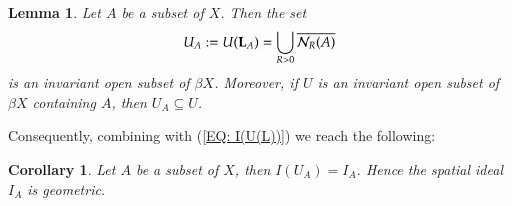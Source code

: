 \documentclass[12pt, a4paper]{amsart}
\numberwithin{equation}{section}
\newtheorem{cor}[thm]{Corollary}
\newtheorem{lem}[thm]{Lemma}
\theoremstyle{definition}
\theoremstyle{remark}
\newtheorem{rem}[thm]{Remark}
\def\CC{\mathbb{C}}
\def\L{\mathcal{L}}
\def\Nd{\mathcal{N}}
\def\B{\mathfrak{B}}
\def\K{\mathfrak{K}}
\def\supp{\mathrm{supp}}
\def\L{{\bf L}}
\begin{document}


\begin{lem}\label{lem: invariant subset}
Let $A$ be a subset of $X$. Then the set
\begin{equation}\label{EQ:UA}
U_A:=U(\L_A) = \bigcup_{R>0} \overline{\Nd_R(A)} 
\end{equation}
is an invariant open subset of $\beta X$. Moreover, if $U$ is an invariant open subset of $\beta X$ containing $A$, then $U_A \subseteq U$.
\end{lem}





Consequently, combining with (\ref{EQ: I(U(L))}) we reach the following:

\begin{cor}\label{cor: ideals to subspace}
Let $A$ be a subset of $X$, then $I(U_A)=I_A$. Hence the spatial ideal $I_A$ is geometric.
\end{cor}

\end{document}
